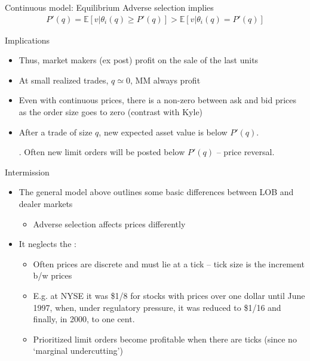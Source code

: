 \documentclass[english,10pt
,aspectratio=169
]{beamer}
\begin{document}
\begin{frame}{Continuous model: Equilibrium}
	Adverse selection implies
	\begin{align}
	P'(q) = \mathbb{E}[v|\theta_i(q) \geq P'(q)] > \mathbb{E}[v|\theta_i(q) = P'(q)]
	\end{align}
	\begin{block}{Implications}
		\begin{itemize}
			\item Thus, market makers (ex post) profit on the sale of the last units
			\item At small realized trades, $q \simeq 0$, MM always profit
			\item Even with continuous prices, there is a non-zero  between ask and bid prices as the order size goes to zero (contrast with Kyle)
			\item After a trade of size $q$, new expected asset value is below $P'(q)$. \pause 
			
			. Often new limit orders will be posted below $P'(q)$ -- price reversal.
		\end{itemize}
	\end{block}
\end{frame}


\begin{frame}{Intermission}
	\begin{itemize}
		\item The general model above outlines some basic differences between LOB and dealer markets
		\begin{itemize}
			\item Adverse selection affects prices differently
		\end{itemize}
		\item It neglects the :
		\begin{itemize}
			\item Often prices are discrete and must lie at a tick --  tick size is the increment b/w prices
			\item E.g. at NYSE it was \$1/8 for stocks with prices over one dollar until June 1997, when, under regulatory pressure, it was reduced to \$1/16 and finally, in 2000, to one cent.
			\item Prioritized limit orders become profitable when there are ticks (since no `marginal undercutting')
		\end{itemize}
	\end{itemize}
\end{frame}
\end{document}
